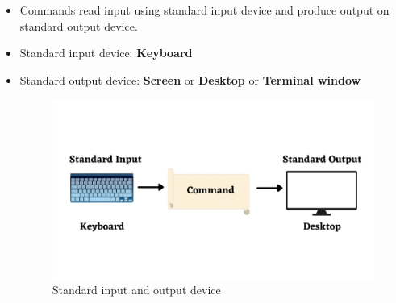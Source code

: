 \setlength{\columnsep}{3pt}
\begin{flushleft}
	\bigskip
	\begin{itemize}
		\item Commands read input using standard input device and produce output on standard output device.
		\item Standard input device: \textbf{Keyboard}
		\item Standard output device: \textbf{Screen} or \textbf{Desktop} or \textbf{Terminal window}
		\begin{figure}[h!]
			\centering
			\includegraphics[scale=.5]{content/chapter7/images/std_in_out.png}
			\caption{Standard input and output device}
			\label{fig:path}
		\end{figure}
	\end{itemize}
	
\end{flushleft}

\newpage


